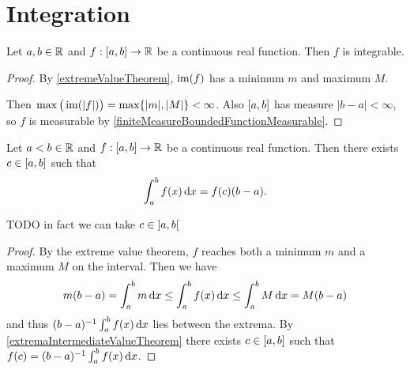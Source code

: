 \section{Integration}
\begin{lemma} \label{continuousRealFunctionIntegrable}
Let $a,b\in \mathbb{R}$ and $f:\interval{a,b}\to \R$ be a continuous real function. Then $f$ is integrable.
\end{lemma}
\begin{proof}
By \ref{extremeValueTheorem}, $\operatorname{im}(f)$ has a minimum $m$ and maximum $M$.

Then $\max\big(\operatorname{im}(|f|)\big) = \max\{|m|, |M|\}<\infty$. Also $\interval{a,b}$ has measure $|b-a|<\infty$, so $f$ is measurable by \ref{finiteMeasureBoundedFunctionMeasurable}.
\end{proof}

\begin{proposition} \label{meanValueTheoremIntegrals}
Let $a<b\in \mathbb{R}$ and $f:\interval{a,b}\to \R$ be a continuous real function. Then there exists $c\in \interval{a,b}$ such that
\[ \int_a^bf(x)\operatorname{d \!}{x} = f(c)(b-a). \]
\end{proposition}
TODO in fact we can take $c\in \interval[o]{a,b}$
\begin{proof}
By the extreme value theorem, $f$ reaches both a minimum $m$ and a maximum $M$ on the interval. Then we have
\[ m(b-a) = \int_a^bm\operatorname{d \!}{x} \leq \int_a^bf(x)\operatorname{d \!}{x} \leq \int_a^bM\operatorname{d \!}{x} = M(b-a) \]
and thus $(b-a)^{-1}\int_a^bf(x)\operatorname{d \!}{x}$ lies between the extrema. By \ref{extremaIntermediateValueTheorem} there exists $c\in \interval{a,b}$ such that $f(c) = (b-a)^{-1}\int_a^bf(x)\operatorname{d \!}{x}$.
\end{proof}


